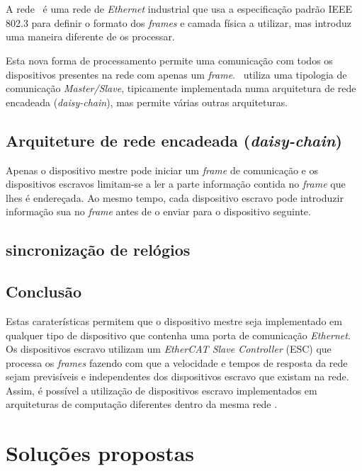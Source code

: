 \section{\ecat}\label{sec:ethercat}

A rede \ecat\ é uma rede de \emph{Ethernet} industrial que usa a
especificação padrão IEEE 802.3 \cite[]{ieee:IEEEStandardEthernet} para
definir o formato dos \emph{frames} e camada física a utilizar, mas
introduz uma maneira diferente de os processar.

Esta nova forma de processamento permite uma comunicação com todos os
dispositivos presentes na rede com apenas um \emph{frame}. \ecat\ utiliza
uma tipologia de comunicação \emph{Master/Slave}, tipicamente implementada
numa arquitetura de rede encadeada (\emph{daisy-chain}), mas permite várias
outras arquiteturas.

\subsection{Arquiteture de rede encadeada (\emph{daisy-chain})}
\label{sec:daisychain}
Apenas o dispositivo mestre pode iniciar um \emph{frame} de comunicação
e os dispositivos escravos limitam-se a ler a parte informação contida
no \emph{frame} que lhes é endereçada. Ao mesmo tempo, cada dispositivo
escravo pode introduzir informação sua  no \emph{frame} antes de o enviar
para o dispositivo seguinte.

\subsection{sincronização de relógios}


\subsection{Conclusão}
Estas caraterísticas permitem que o dispositivo mestre seja implementado
em qualquer tipo de dispositivo que contenha uma porta de comunicação 
\emph{Ethernet}. Os dispositivos escravo utilizam um \emph{EtherCAT Slave
Controller} (ESC) que processa os \emph{frames} fazendo com que a velocidade
e tempos de resposta da rede sejam previsíveis e independentes dos 
dispositivos escravo que existam na rede. Assim, é possível a utilização
de dispositivos escravo implementados em arquiteturas de computação
diferentes dentro da mesma rede \ecat.


\section{Soluções propostas} \label{sec:solution}

